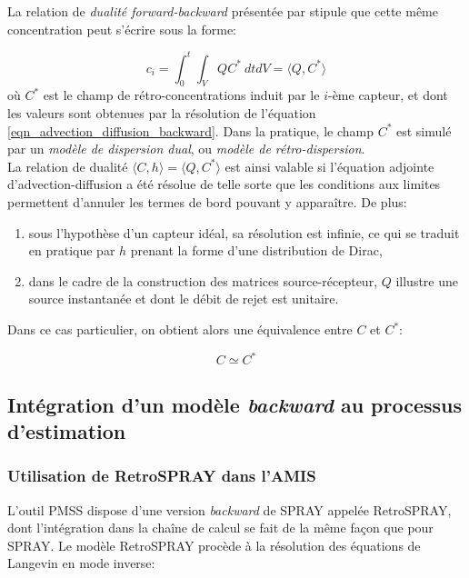 La relation de \textit{dualité forward-backward} présentée par \cite{Keats2007} stipule que cette même concentration peut s'écrire sous la forme:

\begin{equation}
c_i = \int_0^t \int_V Q C^* ~ dtdV = \langle Q, C^*\rangle
\label{eq_int_adjoint}
\end{equation}
où $C^*$ est le champ de rétro-concentrations induit par le $i$-ème capteur, et dont les valeurs sont obtenues par la résolution de l'équation \eqref{eqn_advection_diffusion_backward}. Dans la pratique, le champ $C^*$ est simulé par un \textit{modèle de dispersion dual}, ou \textit{modèle de rétro-dispersion}.\\

La relation de dualité $\langle C,h\rangle = \langle Q,C^* \rangle$ est ainsi valable si l'équation adjointe d'advection-diffusion a été résolue de telle sorte que les conditions aux limites permettent d'annuler les termes de bord pouvant y apparaître. De plus:

\begin{enumerate}
	\item sous l'hypothèse d'un capteur idéal, sa résolution est infinie, ce qui se traduit en pratique par $h$ prenant la forme d'une distribution de Dirac,
	\item dans le cadre de la construction des matrices source-récepteur, $Q$ illustre une source instantanée et dont le débit de rejet est unitaire.
\end{enumerate}

Dans ce cas particulier, on obtient alors une équivalence entre $C$ et $C^*$: 

\begin{equation}
C \simeq C^*
\label{eq_equivalence}
\end{equation}


\subsection{Intégration d'un modèle \textit{backward} au processus d'estimation}

\subsubsection{Utilisation de RetroSPRAY dans l'AMIS}

L'outil PMSS dispose d'une version \textit{backward} de SPRAY appelée RetroSPRAY, dont l'intégration dans la chaîne de calcul se fait de la même façon que pour SPRAY. Le modèle RetroSPRAY procède à la résolution des équations de Langevin en mode inverse: 

